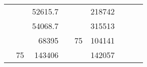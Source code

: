 \begin{table}[]
\begin{tabular}{|ccrccrccr}
\multicolumn{1}{|c|}{\cellcolor[HTML]{FFFFC7}}                                & \multicolumn{1}{c|}{\cellcolor[HTML]{DAE8FC}}                      & \multicolumn{1}{r|}{\cellcolor[HTML]{DAE8FC}52615.7}   & \multicolumn{1}{c|}{\cellcolor[HTML]{FFFFC7}}                                & \multicolumn{1}{c|}{\cellcolor[HTML]{DAE8FC}}                       & \multicolumn{1}{r|}{\cellcolor[HTML]{DDFDFF}218742}    &                                                                              &                                                                    &                                                        \\ \cline{3-3} \cline{6-6}
\multicolumn{1}{|c|}{\cellcolor[HTML]{FFFFC7}}                                & \multicolumn{1}{c|}{\cellcolor[HTML]{DAE8FC}}                      & \multicolumn{1}{r|}{\cellcolor[HTML]{DDFDFF}54068.7}   & \multicolumn{1}{c|}{\cellcolor[HTML]{FFFFC7}}                                & \multicolumn{1}{c|}{\cellcolor[HTML]{DAE8FC}}                       & \multicolumn{1}{r|}{\cellcolor[HTML]{DAE8FC}315513}    &                                                                              &                                                                    &                                                        \\ \cline{3-3} \cline{6-6}
\multicolumn{1}{|c|}{\cellcolor[HTML]{FFFFC7}}                                & \multicolumn{1}{c|}{\cellcolor[HTML]{DAE8FC}}                      & \multicolumn{1}{r|}{\cellcolor[HTML]{DAE8FC}68395}     & \multicolumn{1}{c|}{\cellcolor[HTML]{FFFFC7}}                                & \multicolumn{1}{c|}{\multirow{-10}{*}{\cellcolor[HTML]{DAE8FC}75}}  & \multicolumn{1}{r|}{\cellcolor[HTML]{DDFDFF}104141}    &                                                                              &                                                                    &                                                        \\ \cline{3-3} \cline{5-6}
\multicolumn{1}{|c|}{\cellcolor[HTML]{FFFFC7}}                                & \multicolumn{1}{c|}{\multirow{-10}{*}{\cellcolor[HTML]{DAE8FC}75}} & \multicolumn{1}{r|}{\cellcolor[HTML]{DDFDFF}143406}    & \multicolumn{1}{c|}{\cellcolor[HTML]{FFFFC7}}                                & \multicolumn{1}{c|}{\cellcolor[HTML]{DDFDFF}}                       & \multicolumn{1}{r|}{\cellcolor[HTML]{DAE8FC}142057}    &                                                                              &                                                                    &                                                        \\ \cline{2-3} \cline{6-6}

\end{tabular}
\end{table}
